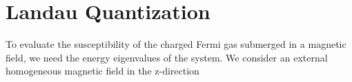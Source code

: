 \documentclass[
aps,
pra,
twocolumn,
showpacs,
preprintnumbers,
amsmath,
amssymb,
footinbib
]{revtex4-2}
\begin{document}
\section{Landau Quantization}\label{sec:LANsec}
\noindent To evaluate the susceptibility of the charged Fermi gas submerged in a magnetic field, we need the energy eigenvalues of the system. We consider an external homogeneous magnetic field in the z-direction
\end{document}
